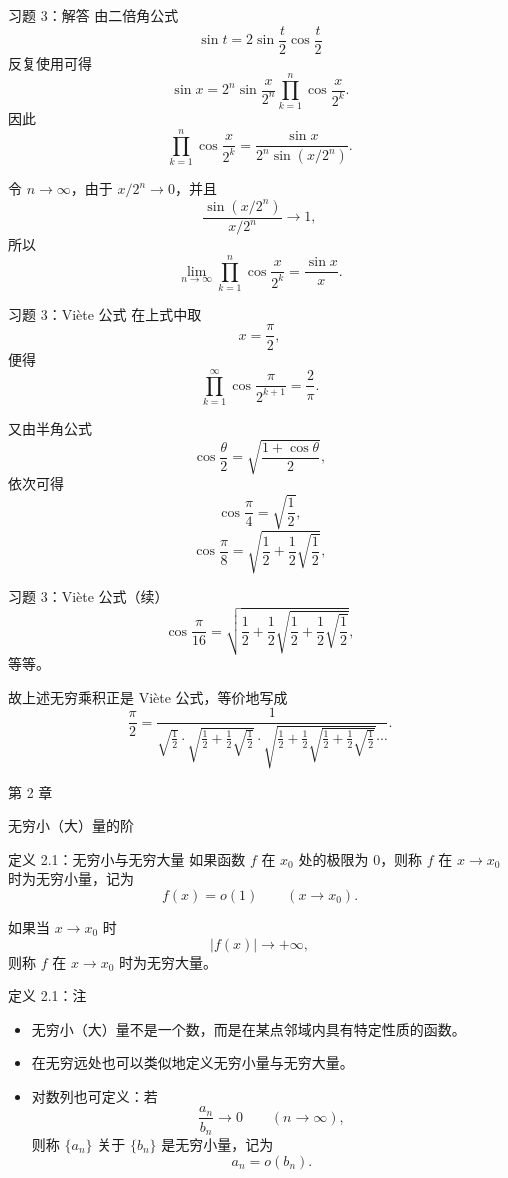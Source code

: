 ﻿\documentclass[aspectratio=169,11pt]{ctexbeamer}
\begin{document}
\begin{frame}[allowframebreaks]{习题 3：解答}
由二倍角公式
\[
  \sin t=2\sin\frac t2\cos\frac t2
\]
反复使用可得
\[
  \sin x
  =
  2^n\sin\frac{x}{2^n}\prod_{k=1}^n\cos\frac{x}{2^k}.
\]
因此
\[
  \prod_{k=1}^n\cos\frac{x}{2^k}
  =
  \frac{\sin x}{2^n\sin(x/2^n)}.
\]

令 $n\to\infty$，由于 $x/2^n\to 0$，并且
\[
  \frac{\sin(x/2^n)}{x/2^n}\to 1,
\]
所以
\[
  \lim_{n\to\infty}\prod_{k=1}^n\cos\frac{x}{2^k}
  =
  \frac{\sin x}{x}.
\]
\end{frame}

\begin{frame}[allowframebreaks]{习题 3：Vi\`ete 公式}
在上式中取
\[
  x=\frac{\pi}{2},
\]
便得
\[
  \prod_{k=1}^{\infty}\cos\frac{\pi}{2^{k+1}}=\frac{2}{\pi}.
\]

又由半角公式
\[
  \cos\frac{\theta}{2}=\sqrt{\frac{1+\cos\theta}{2}},
\]
依次可得
\[
  \cos\frac{\pi}{4}=\sqrt{\frac12},
\]
\[
  \cos\frac{\pi}{8}=\sqrt{\frac12+\frac12\sqrt{\frac12}},
\]
\end{frame}

\begin{frame}{习题 3：Vi\`ete 公式（续）}
\[
  \cos\frac{\pi}{16}
  =
  \sqrt{\frac12+\frac12\sqrt{\frac12+\frac12\sqrt{\frac12}}},
\]
等等。

故上述无穷乘积正是 Vi\`ete 公式，等价地写成
\[
  \frac{\pi}{2}
  =
  \frac{1}{
  \sqrt{\frac12}\cdot
  \sqrt{\frac12+\frac12\sqrt{\frac12}}\cdot
  \sqrt{\frac12+\frac12\sqrt{\frac12+\frac12\sqrt{\frac12}}}\cdots }.
\]
\end{frame}

\begin{frame}
  \centering
  \vspace{2cm}
  {\LARGE 第 2 章}

  \vspace{0.8cm}
  {\Huge 无穷小（大）量的阶}
\end{frame}

\begin{frame}{定义 2.1：无穷小与无穷大量}
如果函数 $f$ 在 $x_0$ 处的极限为 $0$，则称 $f$ 在 $x\to x_0$ 时为无穷小量，记为
\[
  f(x)=o(1)\qquad (x\to x_0).
\]

如果当 $x\to x_0$ 时
\[
  |f(x)|\to+\infty,
\]
则称 $f$ 在 $x\to x_0$ 时为无穷大量。
\end{frame}

\begin{frame}{定义 2.1：注}
\begin{itemize}
  \item 无穷小（大）量不是一个数，而是在某点邻域内具有特定性质的函数。
  \item 在无穷远处也可以类似地定义无穷小量与无穷大量。
  \item 对数列也可定义：若
  \[
    \frac{a_n}{b_n}\to 0\qquad (n\to\infty),
  \]
  则称 $\{a_n\}$ 关于 $\{b_n\}$ 是无穷小量，记为
  \[
    a_n=o(b_n).
  \]
\end{itemize}
\end{frame}
\end{document}

